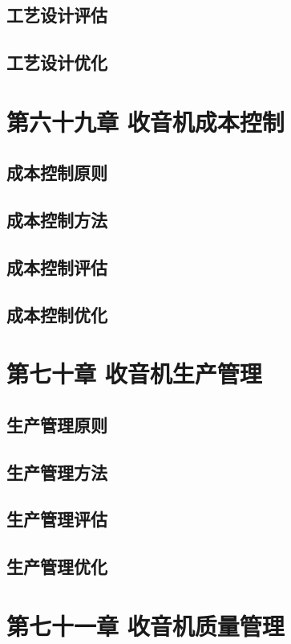 \documentclass[12pt,UTF8]{ctexbook}
\begin{document}
\section{工艺设计评估}
\section{工艺设计优化}

\chapter{第六十九章 收音机成本控制}

\section{成本控制原则}
\section{成本控制方法}
\section{成本控制评估}
\section{成本控制优化}

\chapter{第七十章 收音机生产管理}

\section{生产管理原则}
\section{生产管理方法}
\section{生产管理评估}
\section{生产管理优化}

\chapter{第七十一章 收音机质量管理}
\end{document}
